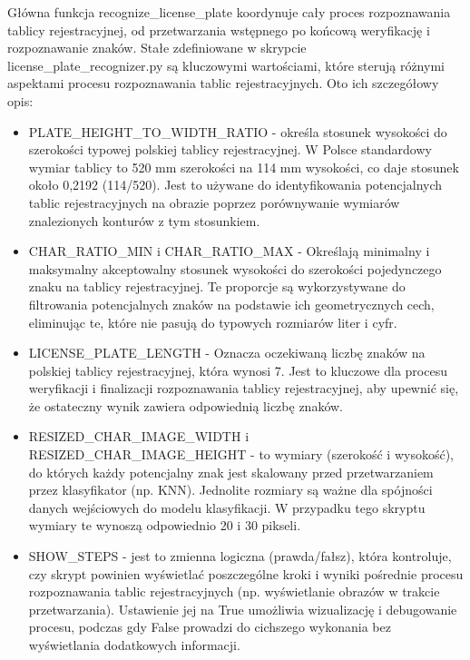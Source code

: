 \documentclass[12pt,a4paper,oneside]{article}
\theoremstyle{definition}
\numberwithin{equation}{section}
\begin{document}
Główna funkcja recognize{\_}license{\_}plate koordynuje cały proces rozpoznawania tablicy rejestracyjnej, od przetwarzania wstępnego po końcową weryfikację i rozpoznawanie znaków. Stałe zdefiniowane w skrypcie license{\_}plate{\_}recognizer.py są kluczowymi wartościami, które sterują różnymi aspektami procesu rozpoznawania tablic rejestracyjnych. Oto ich szczegółowy opis:

\begin{itemize}
  \item PLATE{\_}HEIGHT{\_}TO{\_}WIDTH{\_}RATIO - określa stosunek wysokości do szerokości typowej polskiej tablicy rejestracyjnej. W Polsce standardowy wymiar tablicy to 520 mm szerokości na 114 mm wysokości, co daje stosunek około 0,2192 (114/520). Jest to używane do identyfikowania potencjalnych tablic rejestracyjnych na obrazie poprzez porównywanie wymiarów znalezionych konturów z tym stosunkiem.
  \item CHAR{\_}RATIO{\_}MIN i CHAR{\_}RATIO{\_}MAX - Określają minimalny i maksymalny akceptowalny stosunek wysokości do szerokości pojedynczego znaku na tablicy rejestracyjnej. Te proporcje są wykorzystywane do filtrowania potencjalnych znaków na podstawie ich geometrycznych cech, eliminując te, które nie pasują do typowych rozmiarów liter i cyfr.
  \item LICENSE{\_}PLATE{\_}LENGTH - Oznacza oczekiwaną liczbę znaków na polskiej tablicy rejestracyjnej, która wynosi 7. Jest to kluczowe dla procesu weryfikacji i finalizacji rozpoznawania tablicy rejestracyjnej, aby upewnić się, że ostateczny wynik zawiera odpowiednią liczbę znaków.
  \item RESIZED{\_}CHAR{\_}IMAGE{\_}WIDTH i RESIZED{\_}CHAR{\_}IMAGE{\_}HEIGHT - to wymiary (szerokość i wysokość), do których każdy potencjalny znak jest skalowany przed przetwarzaniem przez klasyfikator (np. KNN). Jednolite rozmiary są ważne dla spójności danych wejściowych do modelu klasyfikacji. W przypadku tego skryptu wymiary te wynoszą odpowiednio 20 i 30 pikseli.
  \item SHOW{\_}STEPS - jest to zmienna logiczna (prawda/fałsz), która kontroluje, czy skrypt powinien wyświetlać poszczególne kroki i wyniki pośrednie procesu rozpoznawania tablic rejestracyjnych (np. wyświetlanie obrazów w trakcie przetwarzania). Ustawienie jej na True umożliwia wizualizację i debugowanie procesu, podczas gdy False prowadzi do cichszego wykonania bez wyświetlania dodatkowych informacji.
\end{itemize}
\end{document}
